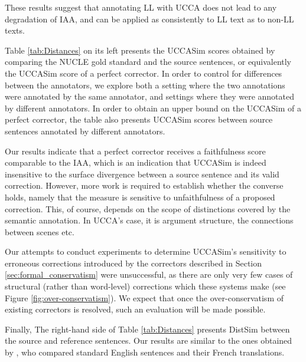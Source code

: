 \documentclass[letter,11pt]{article}
\begin{document}
These results suggest that annotating LL with UCCA does not lead to any degradation of IAA, and can be applied as consistently to LL text as to non-LL texts.

Table \ref{tab:Distances} on its left presents the {\sc UCCASim} scores obtained by comparing the NUCLE gold standard and the source sentences, or equivalently the {\sc UCCASim} score of a perfect corrector.
In order to control for differences between the annotators, we explore both
a setting where the two annotations were annotated by the same annotator,
and settings where they were annotated by different annotators.
In order to obtain an upper bound on the {\sc UCCASim} of a perfect corrector,
the table also presents {\sc UCCASim} scores between 
source sentences annotated by
different annotators.

Our results indicate that a perfect corrector receives a faithfulness score comparable
to the IAA, which is an indication that {\sc UCCASim} is indeed
insensitive to the surface divergence between a source sentence and its valid correction.
However, more work is required to establish whether the converse holds, namely that the measure is sensitive
to unfaithfulness of a proposed correction.
This, of course, depends on the scope of distinctions covered by the semantic annotation.
In UCCA's case, it is argument structure, the connections between scenes etc.

Our attempts to conduct experiments to determine {\sc UCCASim}'s sensitivity to erroneous
corrections introduced by the correctors described in Section \ref{sec:formal_conservatism} were
unsuccessful, as there are only very few cases of structural (rather than word-level)
corrections which these systems make (see Figure \ref{fig:over-conservatism}).
We expect that once the over-conservatism of existing correctors is resolved,
such an evaluation will be made possible.


Finally, The right-hand side of Table \ref{tab:Distances} presents {\sc DistSim} between the source and reference sentences.
Our results are similar to the ones obtained by ,
who compared standard English sentences and their French translations.
\end{document}
